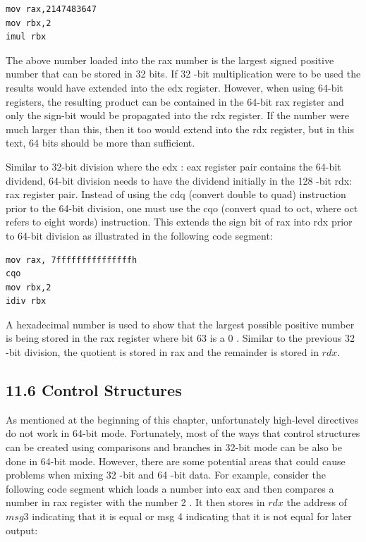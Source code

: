 \documentclass[10pt]{book}
\begin{document}
\begin{center}
\begin{center}
\begin{center}
\begin{center}
\begin{verbatim}
mov rax,2147483647
mov rbx,2
imul rbx
\end{verbatim}

The above number loaded into the rax number is the largest signed positive number that can be stored in 32 bits. If 32 -bit multiplication were to be used the results would have extended into the edx register. However, when using 64-bit registers, the resulting product can be contained in the 64-bit rax register and only the sign-bit would be propagated into the rdx register. If the number were much larger than this, then it too would extend into the rdx register, but in this text, 64 bits should be more than sufficient.

Similar to 32-bit division where the edx : eax register pair contains the 64-bit dividend, 64-bit division needs to have the dividend initially in the 128 -bit rdx:\\
rax register pair. Instead of using the cdq (convert double to quad) instruction prior to the 64-bit division, one must use the cqo (convert quad to oct, where oct refers to eight words) instruction. This extends the sign bit of rax into rdx prior to 64-bit division as illustrated in the following code segment:


\begin{verbatim}
mov rax, 7fffffffffffffffh
cqo
mov rbx,2
idiv rbx
\end{verbatim}

A hexadecimal number is used to show that the largest possible positive number is being stored in the rax register where bit 63 is a 0 . Similar to the previous 32 -bit division, the quotient is stored in rax and the remainder is stored in $r d x$.

\subsection*{11.6 Control Structures}
As mentioned at the beginning of this chapter, unfortunately high-level directives do not work in 64-bit mode. Fortunately, most of the ways that control structures can be created using comparisons and branches in 32-bit mode can be also be done in 64-bit mode. However, there are some potential areas that could cause problems when mixing 32 -bit and 64 -bit data. For example, consider the following code segment which loads a number into eax and then compares a number in rax register with the number 2 . It then stores in $r d x$ the address of $m s g 3$ indicating that it is equal or msg 4 indicating that it is not equal for later output:


\end{center}
\end{center}
\end{center}
\end{center}
\end{document}
